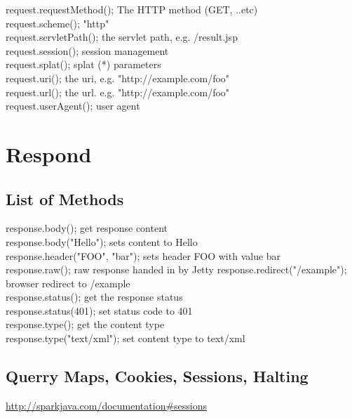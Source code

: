 \documentclass{report}
\begin{document}
request.requestMethod();          \tab 				The HTTP method (GET, ..etc)\\
request.scheme();                 \tab 						"http"\\
request.servletPath();            \tab 					the servlet path, e.g. /result.jsp\\
request.session();                \tab 						session management\\
request.splat();                  \tab 							splat (*) parameters\\
request.uri();                    \tab 								the uri, e.g. "http://example.com/foo"\\
request.url();                    \tab 						the url. e.g. "http://example.com/foo"\\
request.userAgent();              \tab 					user agent\\




\part{Respond}



\chapter{List of Methods}

response.body();               \tab  		get response content\\
response.body("Hello");        \tab  		sets content to Hello\\
response.header("FOO", "bar"); \tab  		sets header FOO with value bar\\
response.raw();                \tab  		raw response handed in by Jetty
response.redirect("/example"); \tab  		browser redirect to /example\\
response.status();             \tab  		get the response status\\
response.status(401);          \tab  		set status code to 401\\
response.type();               \tab  		get the content type\\
response.type("text/xml");     \tab  		set content type to text/xml\\



\chapter{Querry Maps, Cookies, Sessions, Halting}
\url{http://sparkjava.com/documentation#sessions}
\end{document}
